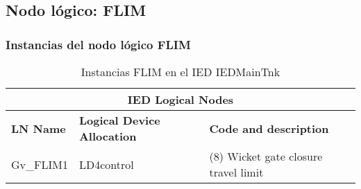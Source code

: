 
\subsection{Nodo l\'ogico: 			 FLIM}

    \subsubsection{Instancias del nodo l\'ogico FLIM}
    \begin{table}[H]
    \begin{center}
    \begin{tabular}{|l|l|p{6.8cm}|}
            \hline
            \multicolumn{3}{|c|}{\cellcolor[gray]{0.8} \textbf{IED Logical Nodes} } \\
            \hline
            \textbf{LN Name} & \textbf{Logical Device Allocation} & \textbf{Code and description} \\
            \hline
            Gv\_FLIM1 & LD4control & (8) Wicket gate closure travel limit \\
            \hline
    \end{tabular}
    \caption{Instancias FLIM en el IED IEDMainTnk}
    \label{table:lnInstFLIM_}
    \end{center}
    \end{table}
    
    
    
